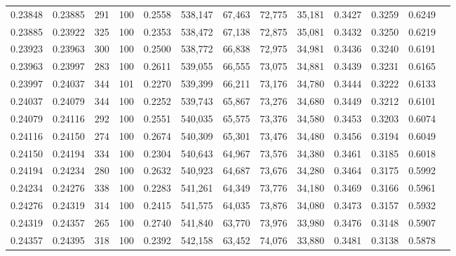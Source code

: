 \begin{tabular}{rrrrrrrrrrrrr}
0.23848 & 0.23885 &   291 & 100 &                                     0.2558 & 538,147 &  67,463 &  72,775 &  35,181 & 0.3427 & 0.3259 & 0.6249 \\
0.23885 & 0.23922 &   325 & 100 &                                     0.2353 & 538,472 &  67,138 &  72,875 &  35,081 & 0.3432 & 0.3250 & 0.6219 \\
0.23923 & 0.23963 &   300 & 100 &                                     0.2500 & 538,772 &  66,838 &  72,975 &  34,981 & 0.3436 & 0.3240 & 0.6191 \\
0.23963 & 0.23997 &   283 & 100 &                                     0.2611 & 539,055 &  66,555 &  73,075 &  34,881 & 0.3439 & 0.3231 & 0.6165 \\
0.23997 & 0.24037 &   344 & 101 &                                     0.2270 & 539,399 &  66,211 &  73,176 &  34,780 & 0.3444 & 0.3222 & 0.6133 \\
0.24037 & 0.24079 &   344 & 100 &                                     0.2252 & 539,743 &  65,867 &  73,276 &  34,680 & 0.3449 & 0.3212 & 0.6101 \\
0.24079 & 0.24116 &   292 & 100 &                                     0.2551 & 540,035 &  65,575 &  73,376 &  34,580 & 0.3453 & 0.3203 & 0.6074 \\
0.24116 & 0.24150 &   274 & 100 &                                     0.2674 & 540,309 &  65,301 &  73,476 &  34,480 & 0.3456 & 0.3194 & 0.6049 \\
0.24150 & 0.24194 &   334 & 100 &                                     0.2304 & 540,643 &  64,967 &  73,576 &  34,380 & 0.3461 & 0.3185 & 0.6018 \\
0.24194 & 0.24234 &   280 & 100 &                                     0.2632 & 540,923 &  64,687 &  73,676 &  34,280 & 0.3464 & 0.3175 & 0.5992 \\
0.24234 & 0.24276 &   338 & 100 &                                     0.2283 & 541,261 &  64,349 &  73,776 &  34,180 & 0.3469 & 0.3166 & 0.5961 \\
0.24276 & 0.24319 &   314 & 100 &                                     0.2415 & 541,575 &  64,035 &  73,876 &  34,080 & 0.3473 & 0.3157 & 0.5932 \\
0.24319 & 0.24357 &   265 & 100 &                                     0.2740 & 541,840 &  63,770 &  73,976 &  33,980 & 0.3476 & 0.3148 & 0.5907 \\
0.24357 & 0.24395 &   318 & 100 &                                     0.2392 & 542,158 &  63,452 &  74,076 &  33,880 & 0.3481 & 0.3138 & 0.5878 \\

\end{tabular}
